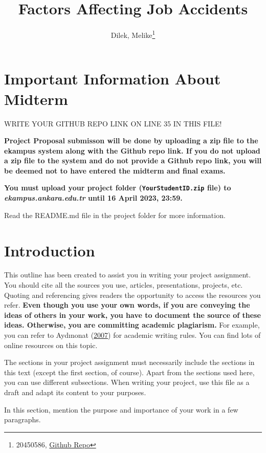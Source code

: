 \documentclass[
  12pt,
]{article}
\title{Factors Affecting Job Accidents}
\author{Dilek, Melike\footnote{20450586, \href{https://github.com/YOUR_USER_NAME_HERE/YOUR_REPO_NAME_HERE}{Github Repo}}}
\date{}
\begin{document}
\maketitle

\hypertarget{important-information-about-midterm}{%
\section{Important Information About Midterm}\label{important-information-about-midterm}}

\colorbox{BurntOrange}{WRITE YOUR GITHUB REPO LINK ON LINE 35 IN THIS FILE!}

\textbf{Project Proposal submisson will be done by uploading a zip file to the ekampus system along with the Github repo link. If you do not upload a zip file to the system and do not provide a Github repo link, you will be deemed not to have entered the midterm and final exams.}

\textbf{You must upload your project folder (\texttt{YourStudentID.zip} file) to \emph{ekampus.ankara.edu.tr} until 16 April 2023, 23:59.}

\colorbox{WildStrawberry}{Read the README.md file in the project folder for more information.}

\hypertarget{introduction}{%
\section{Introduction}\label{introduction}}

This outline has been created to assist you in writing your project assignment. You should cite all the sources you use, articles, presentations, projects, etc. Quoting and referencing gives readers the opportunity to access the resources you refer. \textbf{Even though you use your own words, if you are conveying the ideas of others in your work, you have to document the source of these ideas. Otherwise, you are committing academic plagiarism.} For example, you can refer to Aydınonat (\protect\hyperlink{ref-aydinonat:2007}{2007}) for academic writing rules. You can find lots of online resources on this topic.

The sections in your project assignment must necessarily include the sections in this text (except the first section, of course). Apart from the sections used here, you can use different subsections. When writing your project, use this file as a draft and adapt its content to your purposes.

In this section, mention the purpose and importance of your work in a few paragraphs.
\end{document}
